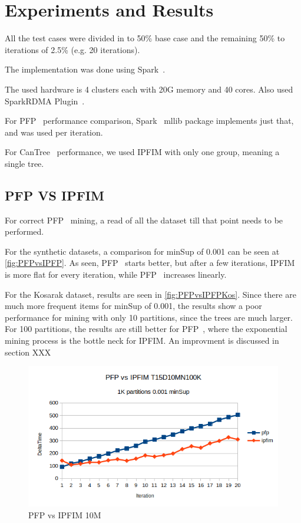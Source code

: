\section{Experiments and Results}


All the test cases were divided in to 50\% base case and the remaining 50\% to iterations of 2.5\% (e.g. 20 iterations).

The implementation was done using Spark~\cite{spark}.

The used hardware is 4 clusters each with 20G memory and 40 cores. Also used SparkRDMA Plugin~\cite{SparkRDMA}.

For PFP~\cite{li2008pfp} performance comparison, Spark~\cite{spark} mllib package implements just that, and was used per iteration.

For CanTree~\cite{leung2005cantree} performance, we used IPFIM with only one group, meaning a single tree.

\subsection{PFP VS IPFIM}
 For correct PFP~\cite{li2008pfp} mining, a read of all the dataset till that point needs to be performed.

For the synthetic datasets, a comparison for minSup of 0.001 can be seen at \autoref{fig:PFPvsIPFP}. As seen, PFP~\cite{li2008pfp} starts better, but after a few iterations, IPFIM is more flat for every iteration, while PFP~\cite{li2008pfp} increases linearly.

For the Kosarak dataset, results are seen in \autoref{fig:PFPvsIPFPKos}.
Since there are much more frequent items for minSup of 0.001, the results show a poor performance for mining with only 10 partitions, since the trees are much larger. For 100 partitions, the results are still better for PFP~\cite{li2008pfp}, where the exponential mining process is the bottle neck for IPFIM. An improvment is discussed in section XXX

\begin{figure}
  \centering
  \includegraphics[width=\linewidth]{figures/PFPvsIPFIM0_001_10M}
  \caption{PFP vs IPFIM 10M}
  \label{fig:PFPvsIPFP}
\end{figure}

